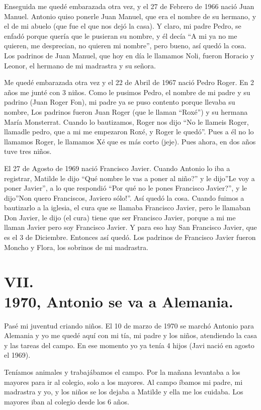 \documentclass[12pt,a5paper]{book}
\begin{document}
Enseguida me quedé embarazada otra vez, y el 27 de Febrero de 1966 nació Juan Manuel. Antonio quiso ponerle Juan Manuel, que era el nombre de su hermano, y el de mi abuelo (que fue el que nos dejó la casa). Y claro, mi padre Pedro, se enfadó porque quería que le pusieran su nombre, y él decía “A mi ya no me quieren, me desprecian, no quieren mi nombre”, pero bueno, así quedó la cosa. Los padrinos de Juan Manuel, que hoy en día le llamamos Noli, fueron Horacio y Leonor, el hermano de mi madrastra y su señora.

Me quedé embarazada otra vez y el 22 de Abril de 1967 nació Pedro Roger. En 2 años me junté con 3 niños. Como le pusimos Pedro, el nombre de mi padre y su padrino (Juan Roger Fon), mi padre ya se puso contento porque llevaba su nombre, Los padrinos fueron Juan Roger (que le llaman “Roxé”) y su hermana María Monsterrat. Cuando lo bautizamos, Roger nos dijo “No le llameis Roger, llamadle pedro, que a mi me empezaron Roxé, y Roger le quedó”. Pues a él no lo llamamos Roger, le llamamos Xé que es más corto (jeje).  Pues ahora, en dos años tuve tres niños.

 El 27 de Agosto de 1969 nació Francisco Javier.  Cuando Antonio lo iba a registrar, Matilde le dijo “Qué nombre le vas a poner al niño?” y le dijo”Le voy a poner Javier”, a lo que respondió “Por qué no le pones Francisco Javier?”, y le dijo”Non quero Franciscos, Javiero sólo!”. Así quedó la cosa. Cuando fuimos a bautizarlo a la iglesia, el cura que se llamaba Francisco Javier, pero le llamaban Don Javier, le dijo (el cura) tiene que ser Francisco Javier, porque a mi me llaman Javier pero soy Francisco Javier. Y para eso hay San Francisco Javier, que es el 3 de Diciembre. Entonces así quedó. Los padrinos de Francisco Javier fueron Moncho y Flora, los sobrinos de mi madrastra.


\section*{VII.\\1970, Antonio se va a Alemania.}

Pasé mi juventud criando niños. El 10 de marzo de 1970 se marchó Antonio para Alemania y yo me quedé aquí con mi tía, mi padre y los niños, atendiendo la casa y las tareas del campo. En ese momento yo ya tenía 4 hijos (Javi nació en agosto el 1969).

Teníamos animales y trabajábamos el campo. Por la mañana levantaba a los mayores para ir al colegio, solo a los mayores. Al campo íbamos mi padre, mi madrastra y yo, y los niños se los dejaba a Matilde y ella me los cuidaba. Los mayores iban al colegio desde los 6 años.
\end{document}

